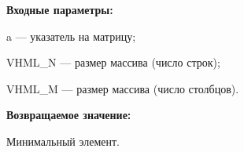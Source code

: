 \textbf{Входные параметры:}

 a --- указатель на матрицу;
 
 VHML\_N --- размер массива (число строк);
 
 VHML\_M --- размер массива (число столбцов).

\textbf{Возвращаемое значение:}

 Минимальный элемент.